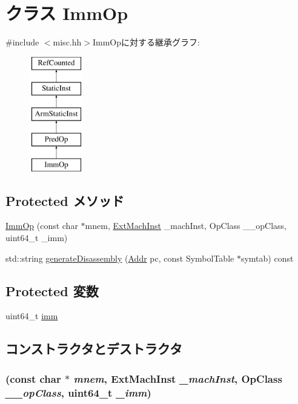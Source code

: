 \hypertarget{classImmOp}{
\section{クラス ImmOp}
\label{classImmOp}
}


{\ttfamily \#include $<$misc.hh$>$}ImmOpに対する継承グラフ:\begin{figure}[H]
\begin{center}
\leavevmode
\includegraphics[height=5cm]{classImmOp}
\end{center}
\end{figure}
\subsection*{Protected メソッド}
\begin{DoxyCompactItemize}
\item 
\hyperlink{classImmOp_a3a9a5064fbd550b18ae6e6edaf9e57d7}{ImmOp} (const char $\ast$mnem, \hyperlink{classStaticInst_a5605d4fc727eae9e595325c90c0ec108}{ExtMachInst} \_\-machInst, OpClass \_\-\_\-opClass, uint64\_\-t \_\-imm)
\item 
std::string \hyperlink{classImmOp_a95d323a22a5f07e14d6b4c9385a91896}{generateDisassembly} (\hyperlink{classm5_1_1params_1_1Addr}{Addr} pc, const SymbolTable $\ast$symtab) const 
\end{DoxyCompactItemize}
\subsection*{Protected 変数}
\begin{DoxyCompactItemize}
\item 
uint64\_\-t \hyperlink{classImmOp_a2b4406ad2843b5aa12d244d01d8fdc69}{imm}
\end{DoxyCompactItemize}


\subsection{コンストラクタとデストラクタ}
\hypertarget{classImmOp_a3a9a5064fbd550b18ae6e6edaf9e57d7}{
\subsubsection[{ImmOp}]{ (const char $\ast$ {\em mnem}, \/  {\bf ExtMachInst} {\em \_\-machInst}, \/  OpClass {\em \_\-\_\-opClass}, \/  uint64\_\-t {\em \_\-imm})}}
\label{classImmOp_a3a9a5064fbd550b18ae6e6edaf9e57d7}




